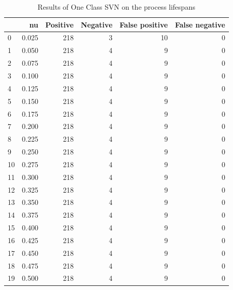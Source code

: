 \documentclass[a4paper,twoside,12pt]{book}
\begin{document}
\begin{appendices}
\begin{table}
	\centering
	\caption{Results of One Class SVN on the process lifespans}
	\label{id:tab:OCSVMexitCode}
	\begin{tabular}{lrrrrr}
		\toprule
		{} &     nu &  Positive &  Negative &  False positive &  False negative \\
		\midrule
		0  &  0.025 &       218 &         3 &              10 &               0 \\
		1  &  0.050 &       218 &         4 &               9 &               0 \\
		2  &  0.075 &       218 &         4 &               9 &               0 \\
		3  &  0.100 &       218 &         4 &               9 &               0 \\
		4  &  0.125 &       218 &         4 &               9 &               0 \\
		5  &  0.150 &       218 &         4 &               9 &               0 \\
		6  &  0.175 &       218 &         4 &               9 &               0 \\
		7  &  0.200 &       218 &         4 &               9 &               0 \\
		8  &  0.225 &       218 &         4 &               9 &               0 \\
		9  &  0.250 &       218 &         4 &               9 &               0 \\
		10 &  0.275 &       218 &         4 &               9 &               0 \\
		11 &  0.300 &       218 &         4 &               9 &               0 \\
		12 &  0.325 &       218 &         4 &               9 &               0 \\
		13 &  0.350 &       218 &         4 &               9 &               0 \\
		14 &  0.375 &       218 &         4 &               9 &               0 \\
		15 &  0.400 &       218 &         4 &               9 &               0 \\
		16 &  0.425 &       218 &         4 &               9 &               0 \\
		17 &  0.450 &       218 &         4 &               9 &               0 \\
		18 &  0.475 &       218 &         4 &               9 &               0 \\
		19 &  0.500 &       218 &         4 &               9 &               0 \\

\end{tabular}
\end{table}
\end{appendices}
\end{document}
